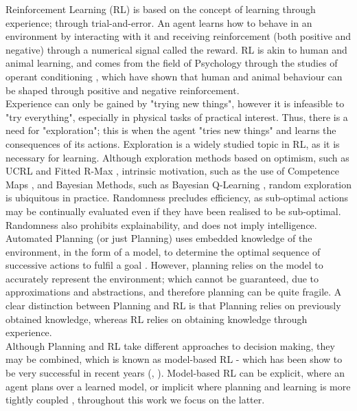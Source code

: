 Reinforcement Learning (RL) \cite{DBLP:books/lib/SuttonB98} is based on the concept of learning through experience; through trial-and-error. An agent learns how to behave in an environment by interacting with it and receiving reinforcement (both positive and negative) through a numerical signal called the reward. RL is akin to human and animal learning, and comes from the field of Psychology through the studies of operant conditioning \cite{nla.cat-vn2770732}, which have shown that human and animal behaviour can be shaped through positive and negative reinforcement.
\\Experience can only be gained by "trying new things", however it is infeasible to "try everything", especially in physical tasks of practical interest. Thus, there is a need for "exploration"; this is when the agent "tries new things" and learns the consequences of its actions. Exploration is a widely studied topic in RL, as it is necessary for learning. Although exploration methods based on optimism, such as UCRL \cite{NIPS2006_c1b70d96} and Fitted R-Max \cite{SARA07-jong}, intrinsic motivation, such as the use of Competence Maps \cite{NIPS1991_e5f6ad6c}, and Bayesian Methods, such as Bayesian Q-Learning \cite{10.5555/295240.295801}, random exploration is ubiquitous in practice. Randomness precludes efficiency, as sub-optimal actions may be continually evaluated even if they have been realised to be sub-optimal. Randomness also prohibits explainability, and does not imply intelligence.
\\Automated Planning (or just Planning) uses embedded knowledge of the environment, in the form of a model, to determine the optimal sequence of successive actions to fulfil a goal \cite{russelNorvig2003:aima, Lav06}. However, planning relies on the model to accurately represent the environment; which cannot be guaranteed, due to approximations and abstractions, and therefore planning can be quite fragile. A clear distinction between Planning and RL is that Planning relies on previously obtained knowledge, whereas RL relies on obtaining knowledge through experience.
\\Although Planning and RL take different approaches to decision making, they may be combined, which is known as model-based RL - which has been show to be very successful in recent years (\cite{silver2017mastering}, \cite{pmlr-v28-levine13}). Model-based RL can be explicit, where an agent plans over a learned model, or implicit where planning and learning is more tightly coupled \cite{MAL-086}, throughout this work we focus on the latter.
